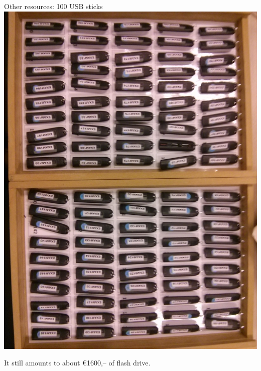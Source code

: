 \begin{frame}{Other resources: 100 USB sticks}
\includegraphics[angle=90,width=\textwidth]{figures/boxesofsticks.jpg}

It still amounts to about \euro 1600,-- of flash drive.
\end{frame}
